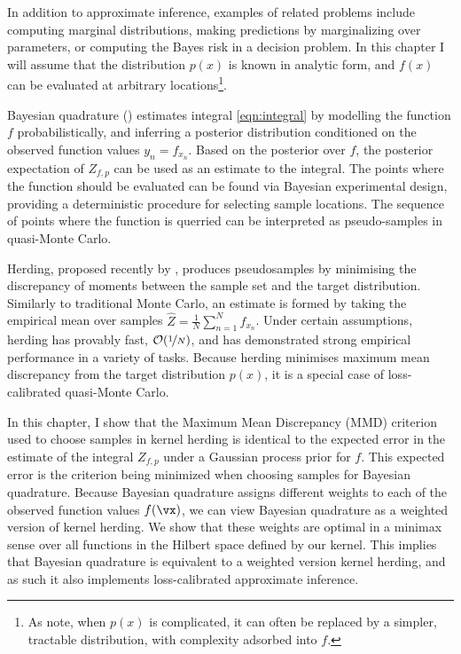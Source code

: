 In addition to approximate inference, examples of related problems include computing marginal distributions, making predictions by marginalizing over parameters, or computing the Bayes risk in a decision problem. In this chapter I will assume that the distribution $p(x)$ is known in analytic form, and $f(x)$ can be evaluated at arbitrary locations\footnote{As \citet{BZMonteCarlo} note, when $p(x)$ is complicated, it can often be replaced by a simpler, tractable distribution, with complexity adsorbed into $f$.}.

Bayesian quadrature (\bq{}) estimates integral \eqref{eqn:integral} by modelling the function $f$ probabilistically, and inferring a posterior distribution conditioned on the observed function values $y_n = f_{x_n}$. Based on the posterior over $f$, the posterior expectation of $Z_{f,p}$ can be used as an estimate to the integral. The points where the function should be evaluated can be found via Bayesian experimental design, providing a deterministic procedure for selecting sample locations. The sequence of points where the function is querried can be interpreted as pseudo-samples in quasi-Monte Carlo.

Herding, proposed recently by \cite{Chen2010}, produces pseudosamples by minimising the discrepancy of moments between the sample set and the target distribution. Similarly to traditional Monte Carlo, an estimate is formed by taking the empirical mean over samples $\hat{Z} = \frac{1}{N}\sum_{n=1}^{N}f_{x_n}$. Under certain assumptions, herding has provably fast, $\mathcal{O}(\nicefrac{1}{N})$, and has demonstrated strong empirical performance in a variety of tasks. Because herding minimises maximum mean discrepancy from the target distribution $p(x)$, it is a special case of loss-calibrated quasi-Monte Carlo.

In this chapter, I show that the Maximum Mean Discrepancy (MMD) criterion used to choose samples in kernel herding is identical to the expected error in the estimate of the integral $Z_{f,p}$ under a Gaussian process prior for $f$. This expected error is the criterion being minimized when choosing samples for Bayesian quadrature. Because Bayesian quadrature assigns different weights to each of the observed function values $f(\vx)$, we can view Bayesian quadrature as a weighted version of kernel herding. We show that these weights are optimal in a minimax sense over all functions in the Hilbert space defined by our kernel. This implies that Bayesian quadrature is equivalent to a weighted version kernel herding, and as such it also implements loss-calibrated approximate inference.

